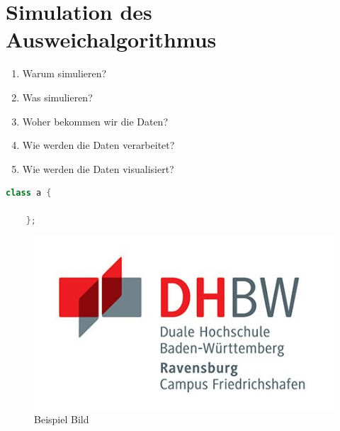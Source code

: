 \section{Simulation des Ausweichalgorithmus}

\begin{enumerate}
    \item Warum simulieren?
    \item Was simulieren?
    \item Woher bekommen wir die Daten?
    \item Wie werden die Daten verarbeitet?
    \item Wie werden die Daten visualisiert?
\end{enumerate}

\begin{lstlisting}[language=C++, caption=Beispiel Listing]
    class a {

    };
\end{lstlisting}

\begin{figure}
    \centering
    \includegraphics[]{graphics/DHBW_logo.jpg}
    \caption{Beispiel Bild}
    \label{fig:bsp_bild}
\end{figure}

\newpage

